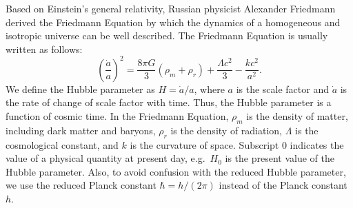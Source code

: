 Based on Einstein's general relativity, Russian physicist Alexander Friedmann
derived the Friedmann Equation by which the dynamics of a homogeneous and
isotropic universe can be well described. The Friedmann Equation is usually
written as follows:
\[
\left(\frac{\dot{a}}{a}\right)^2
  = \frac{8\pi G}{3}(\rho_m + \rho_r) + \frac{\Lambda c^2}{3}
    - \frac{kc^2}{a^2}.
\]
We define the Hubble parameter as $H = \dot{a}/a$, where $a$ is the scale
factor and $\dot{a}$ is the rate of change of scale factor with time. Thus,
the Hubble parameter is a function of cosmic time. In the Friedmann Equation,
$\rho_m$ is the density of matter, including dark matter and baryons,
$\rho_r$ is the density of radiation, $\Lambda$ is the cosmological constant,
and $k$ is the curvature of space. Subscript 0 indicates the value of a
physical quantity at present day, e.g.\ $H_0$ is the present value of the
Hubble parameter. Also, to avoid confusion with the reduced Hubble parameter,
we use the reduced Planck constant $\hbar = h/(2\pi)$ instead of the Planck
constant $h$.

